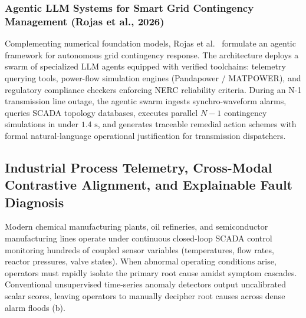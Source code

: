 \subsubsection{Agentic LLM Systems for Smart Grid Contingency Management (Rojas et al., 2026)}
Complementing numerical foundation models, Rojas et al.~\cite{Rojas2026LLMAgentGrid} formulate an agentic framework for autonomous grid contingency response. The architecture deploys a swarm of specialized LLM agents equipped with verified toolchains: telemetry querying tools, power-flow simulation engines (Pandapower / MATPOWER), and regulatory compliance checkers enforcing NERC reliability criteria. During an N-1 transmission line outage, the agentic swarm ingests synchro-waveform alarms, queries SCADA topology databases, executes parallel $N-1$ contingency simulations in under $1.4\text{ s}$, and generates traceable remedial action schemes with formal natural-language operational justification for transmission dispatchers.

\subsection{Industrial Process Telemetry, Cross-Modal Contrastive Alignment, and Explainable Fault Diagnosis}
\label{sec:industrial_fdd_multimodal}

Modern chemical manufacturing plants, oil refineries, and semiconductor manufacturing lines operate under continuous closed-loop SCADA control monitoring hundreds of coupled sensor variables (temperatures, flow rates, reactor pressures, valve states). When abnormal operating conditions arise, operators must rapidly isolate the primary root cause amidst symptom cascades. Conventional unsupervised time-series anomaly detectors output uncalibrated scalar scores, leaving operators to manually decipher root causes across dense alarm floods (b).

